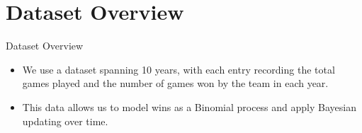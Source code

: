 \section{Dataset Overview}

\begin{frame}{Dataset Overview}

  \begin{itemize}
    \item We use a dataset spanning 10 years, with each entry recording the total games played and the number of games won by the team in each year.
    \item This data allows us to model wins as a Binomial process and apply Bayesian updating over time.
  \end{itemize}
  
\end{frame}
